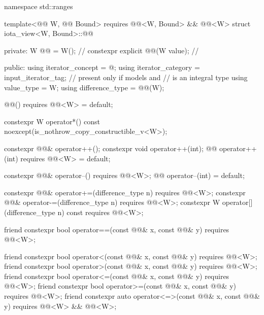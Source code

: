 %
\begin{codeblock}
namespace std::ranges {
  template<@@ W, @@ Bound>
    requires @@<W, Bound> && @@<W>
  struct iota_view<W, Bound>::@@ {
  private:
    W @@ = W();                             // \expos
    constexpr explicit @@(W value);       // \expos

  public:
    using iterator_concept = @\seebelow@;
    using iterator_category = input_iterator_tag;       // present only if  models  and
                                                        //  is an integral type
    using value_type = W;
    using difference_type = @@(W);

    @@() requires @@<W> = default;

    constexpr W operator*() const noexcept(is_nothrow_copy_constructible_v<W>);

    constexpr @@& operator++();
    constexpr void operator++(int);
    @@ operator++(int) requires @@<W> = default;

    constexpr @@& operator--() requires @@<W>;
    @@ operator--(int) = default;

    constexpr @@& operator+=(difference_type n)
      requires @@<W>;
    constexpr @@& operator-=(difference_type n)
      requires @@<W>;
    constexpr W operator[](difference_type n) const
      requires @@<W>;

    friend constexpr bool operator==(const @@& x, const @@& y)
      requires @@<W>;

    friend constexpr bool operator<(const @@& x, const @@& y)
      requires @@<W>;
    friend constexpr bool operator>(const @@& x, const @@& y)
      requires @@<W>;
    friend constexpr bool operator<=(const @@& x, const @@& y)
      requires @@<W>;
    friend constexpr bool operator>=(const @@& x, const @@& y)
      requires @@<W>;
    friend constexpr auto operator<=>(const @@& x, const @@& y)
      requires @@<W> && @@<W>;

}}
\end{codeblock}
